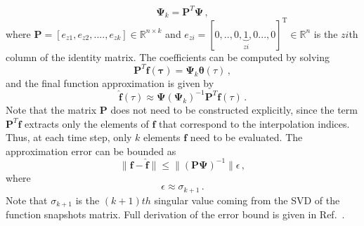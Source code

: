 \documentclass[]{interact}
\theoremstyle{plain}%
\theoremstyle{definition}
\theoremstyle{remark}
\begin{document}
\begin{equation}
\mathbf{\Psi}_k = \mathbf{P}^T\mathbf{\Psi}\, ,
\end{equation}
where $\mathbf{P} = [e_{z1}, e_{z2}, ....,e_{zk}] \in \mathbb{R}^{n\times k}$ and $e_{zi} = [0,.., 0, \underbrace{1}_{{zi}}, 0..., 0]^\text{T} \in \mathbb{R}^{n}$
is the  ${zi}$th column of the identity matrix.
The coefficients can be computed by solving
\begin{equation}
\mathbf{P}^T\mathbf{f(\tau)}=\mathbf{\Psi}_k \boldsymbol{\theta}(\tau)\, ,
\label{eq:DEIM coefficients}
\end{equation}
and the final function approximation is given by
\begin{equation}
\hat{\mathbf{f}}(\tau)\approx\mathbf{\Psi}( \mathbf{\Psi}_k)^{-1}\mathbf{P}^T\mathbf{f} (\tau)\, .
\end{equation}
Note that the matrix $\mathbf{P}$ does not need to be constructed explicitly, since the term $\mathbf{P}^T\mathbf{f}$ extracts only the elements of $\mathbf{f}$ that correspond to the interpolation indices.
Thus, at each time step, only $k$ elements $\mathbf{f}$ need to be evaluated.
The approximation error can be bounded as 
\begin{equation}
\|\mathbf{f} - \hat{\mathbf{f}} \| \le \|(\mathbf{P}\mathbf{\Psi})^{-1} \| \epsilon \, ,
\end{equation}
where
\begin{equation*}
\epsilon \approx \sigma_{k+1} \, .
\end{equation*}
Note that $\sigma_{k+1}$ is the $(k+1)th$ singular value coming from the SVD of the function snapshots matrix.
Full derivation of the error bound is given in Ref.~\cite{chaturantabut2010nonlinear}.
\end{document}
